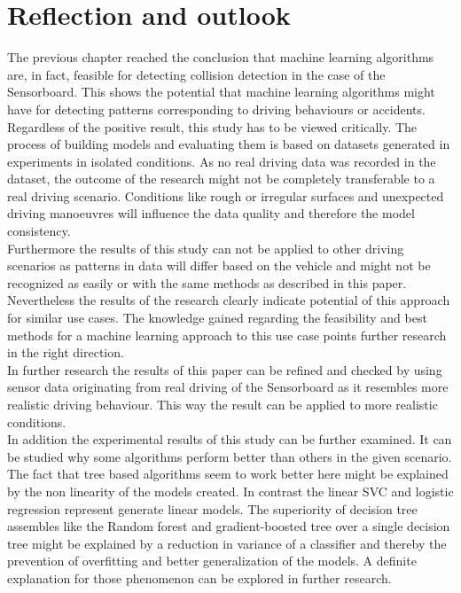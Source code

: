 \chapter{Reflection and outlook}
The previous chapter reached the conclusion that machine learning algorithms are, in fact, feasible for detecting collision detection in the case of the Sensorboard. This shows the potential that machine learning algorithms might have for detecting patterns corresponding to driving behaviours or accidents.
\\
Regardless of the positive result, this study has to be viewed critically. The process of building models and evaluating them is based on datasets generated in experiments in isolated conditions. As no real driving data was recorded in the dataset, the outcome of the research might not be completely transferable to a real driving scenario. Conditions like rough or irregular surfaces and unexpected driving manoeuvres will influence the data quality and therefore the model consistency. 
\\
Furthermore the results of this study can not be applied to other driving scenarios as patterns in data will differ based on the vehicle and might not be recognized as easily or with the same methods as described in this paper.
\\
Nevertheless the results of the research clearly indicate potential of this approach for similar use cases. The knowledge gained regarding the feasibility and best methods for a machine learning approach to this use case points further research in the right direction.
\\
In further research the results of this paper can be refined and checked by using sensor data originating from real driving of the Sensorboard as it resembles more realistic driving behaviour. This way the result can be applied to more realistic conditions. 
\\
In addition the experimental results of this study can be further examined. It can be studied why some algorithms perform better than others in the given scenario. The fact that tree based algorithms seem to work better here might be explained by the non linearity of the models created. In contrast the linear SVC and logistic regression represent generate linear models. The superiority of decision tree assembles like  the Random forest and gradient-boosted tree over a single decision tree might be explained by a reduction in variance of a classifier and thereby the prevention of overfitting and better generalization of the models. A definite explanation for those phenomenon can be explored in further research.
